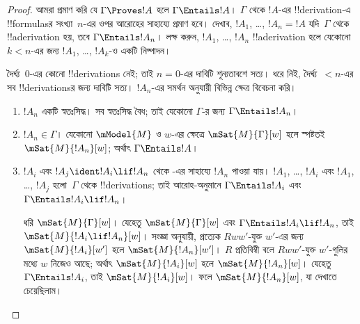 \documentclass[../../../include/open-logic-section]{subfiles}
\begin{document}
\begin{proof}
  আমরা প্রমাণ করি যে $\Gamma \Proves !A$ হলে $\Gamma \Entails !A$।
  $\Gamma$ থেকে $!A$-এর !!{derivation}-এ !!{formula}sর
  সংখ্যা~$n$-এর ওপর আরোহের সাহায্যে প্রমাণ হবে। দেখাব,
  $!A_1$, \dots, $!A_n = !A$ যদি~$\Gamma$ থেকে
  !!a{derivation} হয়, তবে $\Gamma \Entails !A_n$। লক্ষ করুন,
  $!A_1$, \dots, $!A_n$ !!a{derivation} হলে যেকোনো $k<n$-এর
  জন্য $!A_1$, \dots, $!A_k$-ও একটি নিষ্পাদন।

  দৈর্ঘ্য~$0$-এর কোনো !!{derivation}s নেই; তাই $n=0$-এর দাবিটি
  শূন্যতাবশে সত্য। ধরে নিই, দৈর্ঘ্য~$<n$-এর সব
  !!{derivation}sর জন্য দাবিটি সত্য। $!A_n$-এর সমর্থন অনুযায়ী
  বিভিন্ন ক্ষেত্র বিবেচনা করি।

  \begin{enumerate}
  \item $!A_n$ একটি স্বতঃসিদ্ধ। সব স্বতঃসিদ্ধ বৈধ; তাই যেকোনো
    $\Gamma$-র জন্য $\Gamma \Entails !A_n$।
  \item $!A_n \in \Gamma$। যেকোনো $\mModel{M}$ ও $w$-এর
    ক্ষেত্রে $\mSat{M}{\Gamma}[w]$ হলে স্পষ্টতই
    $\mSat{M}{!A_n}[w]$; অর্থাৎ $\Gamma \Entails !A$।
  \item $!A_i$ এবং $!A_j \ident !A_i \lif !A_n$ থেকে \MP{}-এর
    সাহায্যে $!A_n$ পাওয়া যায়। $!A_1$, \dots, $!A_i$ এবং
    $!A_1$, \dots, $!A_j$ হলো~$\Gamma$ থেকে
    !!{derivation}s; তাই আরোহ-অনুমানে $\Gamma \Entails !A_i$
    এবং $\Gamma \Entails !A_i \lif !A_n$।

    ধরি $\mSat{M}{\Gamma}[w]$। যেহেতু
    $\mSat{M}{\Gamma}[w]$ এবং $\Gamma \Entails !A_i \lif
    !A_n$, তাই $\mSat{M}{!A_i \lif !A_n}[w]$। সংজ্ঞা অনুযায়ী,
    প্রত্যেক $Rww'$-যুক্ত $w'$-এর জন্য $\mSat{M}{!A_i}[w']$
    হলে $\mSat{M}{!A_n}[w']$। $R$ প্রতিবিম্বী বলে $Rww'$-যুক্ত
    $w'$-গুলির মধ্যে $w$ নিজেও আছে; অর্থাৎ
    $\mSat{M}{!A_i}[w]$ হলে $\mSat{M}{!A_n}[w]$। যেহেতু
    $\Gamma \Entails !A_i$, তাই $\mSat{M}{!A_i}[w]$। ফলে
    $\mSat{M}{!A_n}[w]$, যা দেখাতে চেয়েছিলাম।
  \end{enumerate}
\end{proof}
\end{document}
